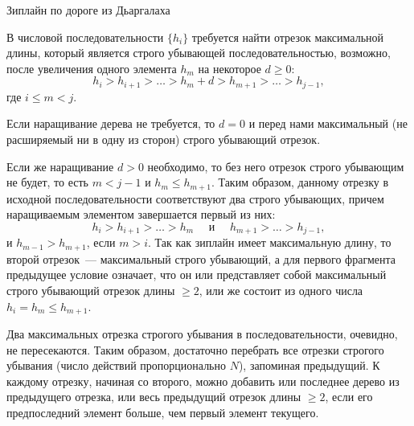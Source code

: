 \begin{tutorial}{Зиплайн по дороге из Дьаргалаха}

{
  \sloppy
  В числовой последовательности $\{h_i\}$ требуется найти отрезок максимальной длины, который является строго убывающей последовательностью, возможно, после увеличения одного элемента $h_m$ на некоторое $d\geq 0$:
  $$h_i > h_{i+1} > \ldots > h_m + d > h_{m+1} > \ldots > h_{j-1},$$
  где $i\leq m < j$.
}

Если наращивание дерева не требуется, то $d=0$ и перед нами максимальный (не расширяемый ни в одну из сторон) строго убывающий отрезок. 

Если же наращивание $d>0$ необходимо, то без него отрезок строго убывающим не будет, то есть $m<j-1$ и $h_m \leq h_{m+1}$. Таким образом, данному отрезку в исходной последовательности соответствуют два строго убывающих, причем наращиваемым элементом завершается первый из них:
$$h_i > h_{i+1} > \ldots > h_m \quad \mbox{ и } \quad  h_{m+1} > \ldots > h_{j-1},$$
и $h_{m-1} > h_{m+1}$, если $m > i$. Так как зиплайн имеет максимальную длину, то второй отрезок~--- максимальный строго убывающий, а для первого фрагмента предыдущее условие означает, что он или представляет собой максимальный строго убывающий отрезок длины $\geq 2$, или же состоит из одного числа $h_i=h_m \leq h_{m+1}$.

Два максимальных отрезка строгого убывания в последовательности, очевидно, не пересекаются. Таким образом, достаточно перебрать все отрезки строгого убывания (число действий пропорционально $N$), запоминая предыдущий. К каждому отрезку, начиная со второго, можно добавить или последнее дерево из предыдущего отрезка, или весь предыдущий отрезок длины $\geq 2$, если его предпоследний элемент больше, чем первый элемент текущего.

\end{tutorial}
